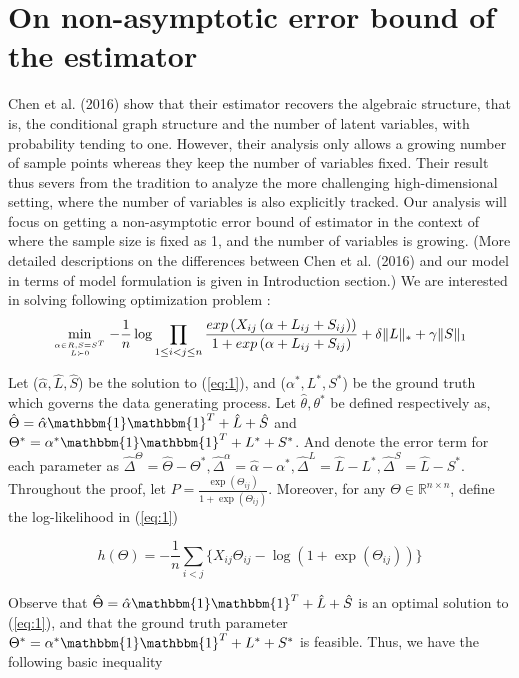 \documentclass{article}
\begin{document}
\section{On non-asymptotic error bound of the estimator}
Chen et al. (2016) show that their estimator recovers the algebraic structure, that is, the conditional graph structure and the number of latent variables, with probability tending to one. However, their analysis only allows a growing number of sample points whereas they keep the number of variables fixed. Their result thus severs from the tradition to analyze the more challenging high-dimensional setting, where the number of variables is also explicitly tracked. Our analysis will focus on getting a non-asymptotic error bound of estimator in the context of where the sample size is fixed as 1, and the number of variables is growing. (More detailed descriptions on the differences between Chen et al. (2016) and our model in terms of model formulation is given in Introduction section.) We are interested in solving following optimization problem : 
\begin{equation}\label{eq:1}
\min\limits_{\alpha \in R, S = S^T \atop L \succ 0}   
-\frac{1}{n} \log \prod_{1\le i< j\le n}\frac{exp\left(X_{ij}\left(\alpha+
L_{ij}+S_{ij}\right)\right)}{1+exp\left(\alpha+
L_{ij}+S_{ij}\right)} + \delta \|L\|_\ast + \gamma \|S\|_1
\end{equation}



Let ($\hat{\alpha},\hat{L},\hat{S}$) be the solution to (\ref{eq:1}), and ($\alpha^{*},L^{*},S^{*}$) be the ground truth which governs the data generating process. Let $\hat{\theta},\theta^{*}$ be defined respectively as, $\hat{\Theta} = \hat{\alpha}\mathbbm{1}\mathbbm{1}^T+\hat{L}+\hat{S}$ and
$\Theta^{*} = \alpha^{*}\mathbbm{1}\mathbbm{1}^T+L^{*}+S^{*}$.
And denote the error term for each parameter as $\hat{\Delta}^{\Theta} = \hat{\Theta}-\Theta^{*}, 
\hat{\Delta}^{\alpha} = \hat{\alpha}-\alpha^{*},
\hat{\Delta}^L = \hat{L}-L^{*},
\hat{\Delta}^S = \hat{L}-S^{*}.$
Throughout the proof, let $P=\frac{\exp(\Theta_{ij})}{1+\exp(\Theta_{ij})}$. Moreover, for any $\Theta \in \mathbb{R}^{n\times n}$, define the log-likelihood in (\ref{eq:1}) 

\[
h(\Theta) = -\frac{1}{n}\sum_{i<j} \Big\{ X_{ij}\Theta_{ij} - \log(1+\exp(\Theta_{ij})) \Big\}
\]

Observe that 
$\hat{\Theta} = \hat{\alpha}\mathbbm{1}\mathbbm{1}^T+\hat{L}+\hat{S}$
is an optimal solution to (\ref{eq:1}), and that the ground truth parameter
$\Theta^{*} = \alpha^{*}\mathbbm{1}\mathbbm{1}^T+L^{*}+S^{*}$ is feasible. Thus, we have the following basic inequality
\end{document}
